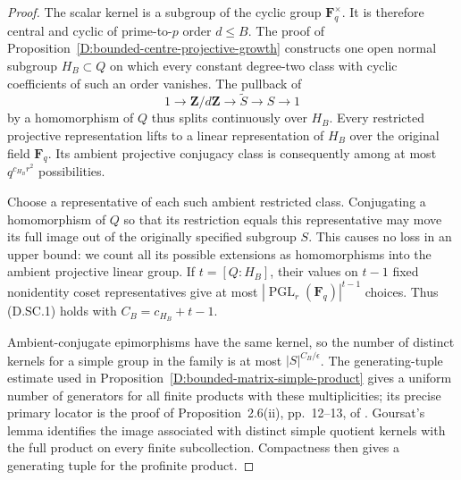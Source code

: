 \begin{proof}
The scalar kernel is a subgroup of the cyclic group $\mathbf F_q^\times$.
It is therefore central and cyclic of prime-to-$p$ order $d\le B$.
The proof of Proposition~\ref{D:bounded-centre-projective-growth}
constructs one open normal subgroup $H_B\subset Q$ on which every
constant degree-two class with cyclic coefficients of such an order
vanishes. The pullback of
\[
 1\longrightarrow\mathbf Z/d\mathbf Z\longrightarrow
        \widetilde S\longrightarrow S\longrightarrow1
\]
by a homomorphism of $Q$ thus splits continuously over $H_B$.
Every restricted projective representation lifts to a linear
representation of $H_B$ over the original field $\mathbf F_q$.
Its ambient projective conjugacy class is consequently among at
most $q^{c_{H_B}r^2}$ possibilities.

Choose a representative of each such ambient restricted class.
Conjugating a homomorphism of $Q$ so that its restriction equals
this representative may move its full image out of the originally
specified subgroup $S$. This causes no loss in an upper bound:
we count all its possible extensions as homomorphisms into the
ambient projective linear group. If $t=[Q:H_B]$, their values on
$t-1$ fixed nonidentity coset representatives give at most
$|\operatorname{PGL}_r(\mathbf F_q)|^{t-1}$ choices. Thus (D.SC.1)
holds with $C_B=c_{H_B}+t-1$.

Ambient-conjugate epimorphisms have the same kernel, so the number
of distinct kernels for a simple group in the family is at most
$|S|^{C_B/\epsilon}$. The generating-tuple estimate used in
Proposition~\ref{D:bounded-matrix-simple-product} gives a uniform
number of generators for all finite products with these
multiplicities; its precise primary locator is the proof of
Proposition~2.6(ii), pp.~12--13, of
\citet{LucchiniMarionTracey2020D}. Goursat's lemma identifies the
image associated with distinct simple quotient kernels with the
full product on every finite subcollection. Compactness then gives
a generating tuple for the profinite product.
\end{proof}

